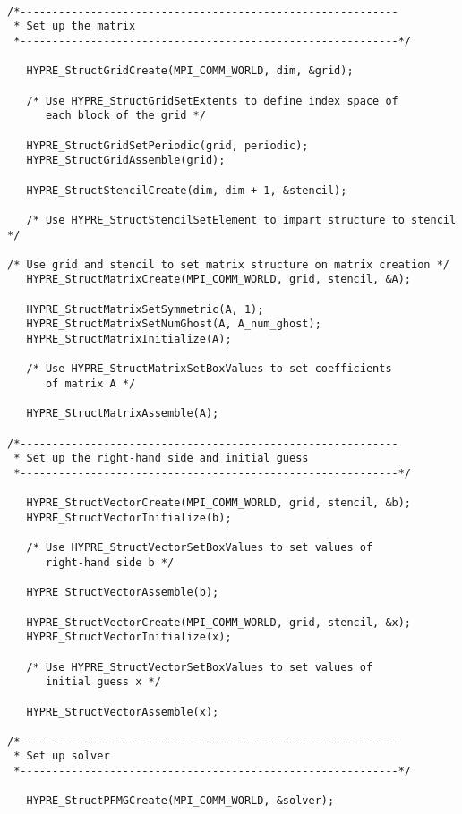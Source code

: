 \begin{display}
\begin{verbatim}

/*-----------------------------------------------------------
 * Set up the matrix
 *-----------------------------------------------------------*/

   HYPRE_StructGridCreate(MPI_COMM_WORLD, dim, &grid);

   /* Use HYPRE_StructGridSetExtents to define index space of
      each block of the grid */

   HYPRE_StructGridSetPeriodic(grid, periodic);
   HYPRE_StructGridAssemble(grid);
	
   HYPRE_StructStencilCreate(dim, dim + 1, &stencil);

   /* Use HYPRE_StructStencilSetElement to impart structure to stencil */

/* Use grid and stencil to set matrix structure on matrix creation */
   HYPRE_StructMatrixCreate(MPI_COMM_WORLD, grid, stencil, &A);

   HYPRE_StructMatrixSetSymmetric(A, 1);
   HYPRE_StructMatrixSetNumGhost(A, A_num_ghost);
   HYPRE_StructMatrixInitialize(A);

   /* Use HYPRE_StructMatrixSetBoxValues to set coefficients
      of matrix A */

   HYPRE_StructMatrixAssemble(A);

/*-----------------------------------------------------------
 * Set up the right-hand side and initial guess
 *-----------------------------------------------------------*/

   HYPRE_StructVectorCreate(MPI_COMM_WORLD, grid, stencil, &b);
   HYPRE_StructVectorInitialize(b);

   /* Use HYPRE_StructVectorSetBoxValues to set values of
      right-hand side b */

   HYPRE_StructVectorAssemble(b);

   HYPRE_StructVectorCreate(MPI_COMM_WORLD, grid, stencil, &x);
   HYPRE_StructVectorInitialize(x);

   /* Use HYPRE_StructVectorSetBoxValues to set values of
      initial guess x */

   HYPRE_StructVectorAssemble(x);

/*-----------------------------------------------------------
 * Set up solver
 *-----------------------------------------------------------*/

   HYPRE_StructPFMGCreate(MPI_COMM_WORLD, &solver);


\end{verbatim}
\end{display}
